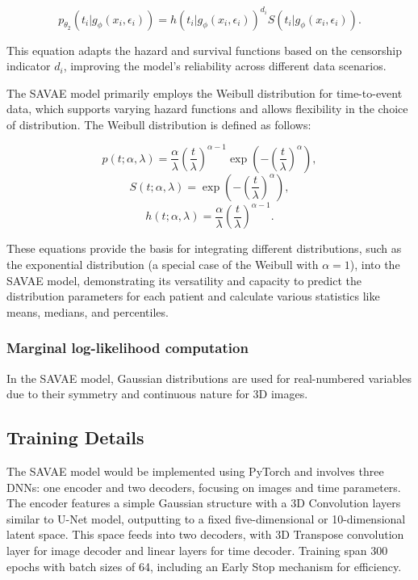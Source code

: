 \documentclass{article}
\begin{document}
\begin{equation}
p_{\theta_2} (t_i|g_\phi(x_i, \epsilon_i)) = h(t_i|g_\phi(x_i, \epsilon_i))^{d_i} S(t_i|g_\phi(x_i, \epsilon_i)).
\end{equation}

This equation adapts the hazard and survival functions based on the censorship indicator \(d_i\), improving the model's reliability across different data scenarios.

The SAVAE model primarily employs the Weibull distribution for time-to-event data, which supports varying hazard functions and allows flexibility in the choice of distribution. The Weibull distribution is defined as follows:

\begin{equation}
p(t; \alpha, \lambda) = \frac{\alpha}{\lambda} \left(\frac{t}{\lambda}\right)^{\alpha-1} \exp\left(-\left(\frac{t}{\lambda}\right)^\alpha\right),
\end{equation}
\begin{equation}
S(t; \alpha, \lambda) = \exp\left(-\left(\frac{t}{\lambda}\right)^\alpha\right),
\end{equation}
\begin{equation}
h(t; \alpha, \lambda) = \frac{\alpha}{\lambda} \left(\frac{t}{\lambda}\right)^{\alpha-1}.
\end{equation}

These equations provide the basis for integrating different distributions, such as the exponential distribution (a special case of the Weibull with \(\alpha = 1\)), into the SAVAE model, demonstrating its versatility and capacity to predict the distribution parameters for each patient and calculate various statistics like means, medians, and percentiles.

\subsubsection{Marginal log-likelihood computation}
In the SAVAE model, Gaussian distributions are used for real-numbered variables due to their symmetry and continuous nature for 3D images.

\subsection{Training Details}
The SAVAE model would be implemented using PyTorch and involves three DNNs: one encoder and two decoders, focusing on images and time parameters. The encoder features a simple Gaussian structure with a 3D Convolution layers similar to U-Net model, outputting to a fixed five-dimensional or 10-dimensional latent space. This space feeds into two decoders, with 3D Transpose convolution layer for image decoder and linear layers for time decoder. Training span 300 epochs with batch sizes of 64, including an Early Stop mechanism for efficiency.
\end{document}
